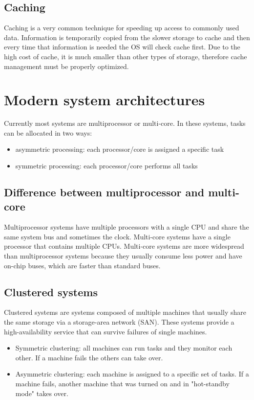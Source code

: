 \subsection{Caching}

Caching is a very common technique for speeding up access to commonly used data. Information is temporarily copied from the slower storage to cache and then every time that information is needed the OS will check cache first. Due to the high cost of cache, it is much smaller than other types of storage, therefore cache management must be properly optimized.

\section{Modern system architectures}

Currently most systems are multiprocessor or multi-core. In these systems, tasks can be allocated in two ways:
\begin{itemize}
  \item asymmetric processing: each processor/core is assigned a specific task
  \item symmetric processing: each processor/core performs all tasks
\end{itemize}

\subsection{Difference between multiprocessor and multi-core}

Multiprocessor systems have multiple processors with a single CPU and share the same system bus and sometimes the clock. Multi-core systems have a single processor that contains multiple CPUs. Multi-core systems are more widespread than multiprocessor systems because they usually consume less power and have on-chip buses, which are faster than standard buses.


\subsection{Clustered systems}

Clustered systems are systems composed of multiple machines that usually share the same storage via a storage-area network (SAN). These systems provide a high-availability service that can survive failures of single machines.
\begin{itemize}
  \item Symmetric clustering: all machines can run tasks and they monitor each other. If a machine fails the others can take over.
  \item Asymmetric clustering: each machine is assigned to a specific set of tasks. If a machine fails, another machine that was turned on and in "hot-standby mode" takes over.
\end{itemize}


